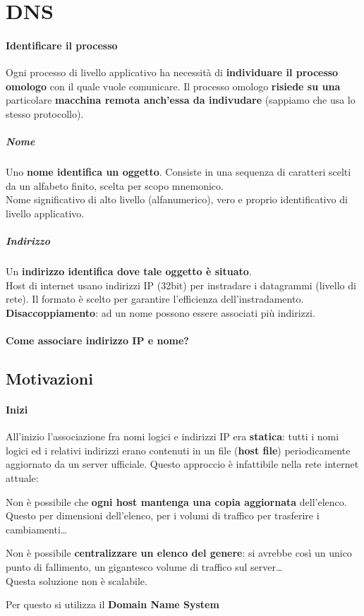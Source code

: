 \documentclass[10pt]{article}
\begin{document}
\section{DNS}
\paragraph{Identificare il processo} Ogni processo di livello applicativo ha necessità di \textbf{individuare il processo omologo} con il quale vuole comunicare. Il processo omologo \textbf{risiede su una} particolare \textbf{macchina remota anch'essa da indivudare} (sappiamo che usa lo stesso protocollo).
\subparagraph{Nome} Uno \textbf{nome identifica un oggetto}. Consiste in una sequenza di caratteri scelti da un alfabeto finito, scelta per scopo mnemonico.\\
Nome significativo di alto livello (alfanumerico), vero e proprio identificativo di livello applicativo.
\subparagraph{Indirizzo} Un \textbf{indirizzo identifica dove tale oggetto è situato}.\\
Host di internet usano indirizzi IP (32bit) per instradare i datagrammi (livello di rete). Il formato è scelto per garantire l'efficienza dell'instradamento.\\
\textbf{Disaccoppiamento}: ad un nome possono essere associati più indirizzi.\\\\
\textbf{Come associare indirizzo IP e nome?}
\subsection{Motivazioni}
\paragraph{Inizi} All'inizio l'associazione fra nomi logici e indirizzi IP era \textbf{statica}: tutti i nomi logici ed i relativi indirizzi erano contenuti in un file (\textbf{host file}) periodicamente aggiornato da un server ufficiale. Questo approccio è infattibile nella rete internet attuale:
\begin{list}{}{}
\item Non è possibile che \textbf{ogni host mantenga una copia aggiornata} dell'elenco. Questo per dimensioni dell'elenco, per i volumi di traffico per trasferire i cambiamenti\ldots
\item Non è possibile \textbf{centralizzare un elenco del genere}: si avrebbe così un unico punto di fallimento, un gigantesco volume di traffico sul server\ldots\\
Questa soluzione non è scalabile.
\end{list}
Per questo si utilizza il \textbf{Domain Name System}
\end{document}

